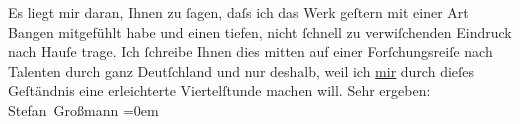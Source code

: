 \begin{ledgroupsized}[t]{13cm}
           \pstart
           Es liegt mir daran, Ihnen zu ſagen, daſs ich das Werk geſtern mit einer Art Bangen
               mitgefühlt habe und einen tiefen, nicht ſchnell zu verwiſchenden Eindruck nach Hauſe
               trage.\pend
           \pstart
           Ich ſchreibe Ihnen dies mitten auf einer Forſchungsreiſe nach Talenten durch ganz Deutſchland und nur deshalb, {\pb}weil ich \uline{mir}
               durch dieſes Geſtändnis eine erleichterte Viertelſtunde machen will.\pend
           \pstart
           Sehr ergeben:{\\[\baselineskip]}\spacefill\mbox{Stefan Großmann}\pend
           \leftskip=0em{}\endnumbering{}\end{ledgroupsized}  \newcommand{\dateiname}{L02052}\newcommand{\titel}{Stefan Großmann an Arthur Schnitzler, 5. 2. 1912}\newcommand{\editorInnen}{ Martin Anton Müller und Gerd-Hermann Susen}
            \footnotesize
\begin{ledgroupsized}[t]{11.5cm}
\end{ledgroupsized}
         
      
